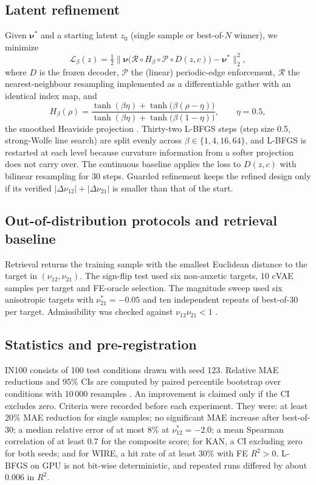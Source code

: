 \documentclass[a4paper,11pt]{article}
\newcommand{\nuot}{\nu_{12}}
\newcommand{\nuto}{\nu_{21}}
\newcommand{\RR}{R^2}
\begin{document}
\subsection{Latent refinement}
Given $\boldsymbol\nu^{*}$ and a starting latent $z_0$ (single sample or
best-of-$N$ winner), we minimize
\begin{equation}
\mathcal L_\beta(z)=\tfrac12\bigl\lVert
\boldsymbol\nu\bigl(\mathcal R\circ H_\beta\circ\mathcal P\circ D(z,c)\bigr)
-\boldsymbol\nu^{*}\bigr\rVert_2^2 ,
\end{equation}
where $D$ is the frozen decoder, $\mathcal P$ the (linear) periodic-edge
enforcement, $\mathcal R$ the nearest-neighbour resampling implemented as a
differentiable gather with an identical index map, and
\begin{equation}
H_\beta(\rho)=\frac{\tanh(\beta\eta)+\tanh\bigl(\beta(\rho-\eta)\bigr)}
{\tanh(\beta\eta)+\tanh\bigl(\beta(1-\eta)\bigr)},\qquad \eta=0.5,
\end{equation}
the smoothed Heaviside projection \citep{wang2011projection}. Thirty-two
L-BFGS steps (step size 0.5, strong-Wolfe line search) are split evenly
across $\beta\in\{1,4,16,64\}$, and L-BFGS is restarted at each level
because curvature information from a softer projection does not carry over.
The continuous baseline applies the loss to $D(z,c)$ with bilinear
resampling for 30 steps. Guarded refinement keeps the refined design only if
its verified $|\Delta\nuot|+|\Delta\nuto|$ is smaller than that of the start.

\subsection{Out-of-distribution protocols and retrieval baseline}
Retrieval returns the training sample with the smallest Euclidean distance
to the target in $(\nuot,\nuto)$. The sign-flip test used six non-auxetic
targets, 10 cVAE samples per target and FE-oracle selection. The magnitude
sweep used six anisotropic targets with $\nuto^{*}=-0.05$ and ten
independent repeats of best-of-30 per target. Admissibility was checked
against $\nuot\nuto<1$ \citep{lempriere1968poisson}.

\subsection{Statistics and pre-registration}
IN100 consists of 100 test conditions drawn with seed 123. Relative MAE
reductions and 95\% CIs are computed by paired percentile bootstrap over
conditions with 10\,000 resamples \citep{efron1993bootstrap}. An
improvement is claimed only if the CI excludes zero. Criteria were recorded
before each experiment. They were: at least 20\% MAE reduction for single
samples; no significant MAE increase after best-of-30; a median relative
error of at most 8\% at $\nuot^{*}=-2.0$; a mean Spearman correlation of at
least 0.7 for the composite score; for KAN, a CI excluding zero for both
seeds; and for WIRE, a hit rate of at least 30\% with FE $\RR>0$. L-BFGS on
GPU is not bit-wise deterministic, and repeated runs differed by about 0.006
in $\RR$.
\end{document}
